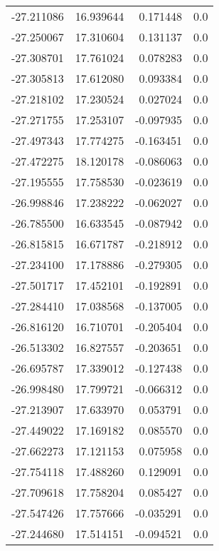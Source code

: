 \begin{tabular}{rrrr}
      -27.211086 &        16.939644 &    0.171448 &   0.0 \\
      -27.250067 &        17.310604 &    0.131137 &   0.0 \\
      -27.308701 &        17.761024 &    0.078283 &   0.0 \\
      -27.305813 &        17.612080 &    0.093384 &   0.0 \\
      -27.218102 &        17.230524 &    0.027024 &   0.0 \\
      -27.271755 &        17.253107 &   -0.097935 &   0.0 \\
      -27.497343 &        17.774275 &   -0.163451 &   0.0 \\
      -27.472275 &        18.120178 &   -0.086063 &   0.0 \\
      -27.195555 &        17.758530 &   -0.023619 &   0.0 \\
      -26.998846 &        17.238222 &   -0.062027 &   0.0 \\
      -26.785500 &        16.633545 &   -0.087942 &   0.0 \\
      -26.815815 &        16.671787 &   -0.218912 &   0.0 \\
      -27.234100 &        17.178886 &   -0.279305 &   0.0 \\
      -27.501717 &        17.452101 &   -0.192891 &   0.0 \\
      -27.284410 &        17.038568 &   -0.137005 &   0.0 \\
      -26.816120 &        16.710701 &   -0.205404 &   0.0 \\
      -26.513302 &        16.827557 &   -0.203651 &   0.0 \\
      -26.695787 &        17.339012 &   -0.127438 &   0.0 \\
      -26.998480 &        17.799721 &   -0.066312 &   0.0 \\
      -27.213907 &        17.633970 &    0.053791 &   0.0 \\
      -27.449022 &        17.169182 &    0.085570 &   0.0 \\
      -27.662273 &        17.121153 &    0.075958 &   0.0 \\
      -27.754118 &        17.488260 &    0.129091 &   0.0 \\
      -27.709618 &        17.758204 &    0.085427 &   0.0 \\
      -27.547426 &        17.757666 &   -0.035291 &   0.0 \\
      -27.244680 &        17.514151 &   -0.094521 &   0.0 \\

\end{tabular}
